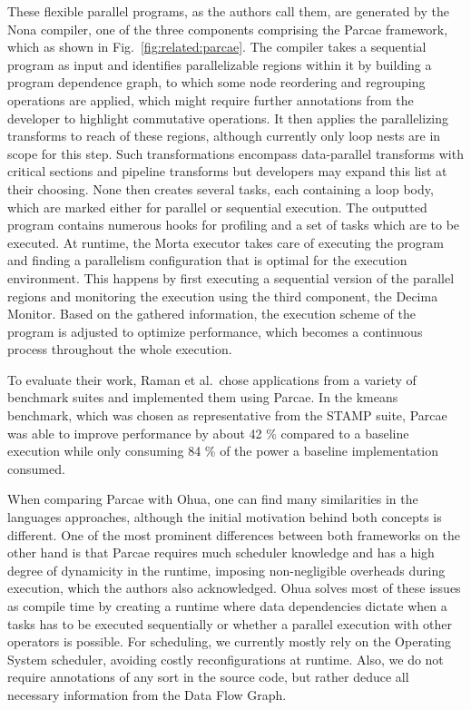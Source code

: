 These flexible parallel programs, as the authors call them, are generated by the Nona compiler, one of the three components comprising the Parcae framework, which as shown in Fig.~\ref{fig:related:parcae}.
The compiler takes a sequential program as input and identifies parallelizable regions within it by building a program dependence graph, to which some node reordering and regrouping operations are applied, which might require further annotations from the developer to highlight commutative operations.
It then applies the parallelizing transforms to reach of these regions, although currently only loop nests are in scope for this step.
Such transformations encompass data-parallel transforms with critical sections and pipeline transforms but developers may expand this list at their choosing.
None then creates several tasks, each containing a loop body, which are marked either for parallel or sequential execution.
The outputted program contains numerous hooks for profiling and a set of tasks which are to be executed.
At runtime, the Morta executor takes care of executing the program and finding a parallelism configuration that is optimal for the execution environment.
This happens by first executing a sequential version of the parallel regions and monitoring the execution using the third component, the Decima Monitor.
Based on the gathered information, the execution scheme of the program is adjusted to optimize performance, which becomes a continuous process throughout the whole execution.

To evaluate their work, Raman et al.\ chose applications from a variety of benchmark suites and implemented them using Parcae.
In the kmeans benchmark, which was chosen as representative from the STAMP suite, Parcae was able to improve performance by about 42 \% compared to a baseline execution while only consuming 84 \% of the power a baseline implementation consumed.

When comparing Parcae with Ohua, one can find many similarities in the languages approaches, although the initial motivation behind both concepts is different.
One of the most prominent differences between both frameworks on the other hand is that Parcae requires much scheduler knowledge and has a high degree of dynamicity in the runtime, imposing non-negligible overheads during execution, which the authors also acknowledged.
Ohua solves most of these issues as compile time by creating a runtime where data dependencies dictate when a tasks has to be executed sequentially or whether a parallel execution with other operators is possible.
For scheduling, we currently mostly rely on the Operating System scheduler, avoiding costly reconfigurations at runtime.
Also, we do not require annotations of any sort in the source code, but rather deduce all necessary information from the Data Flow Graph.

